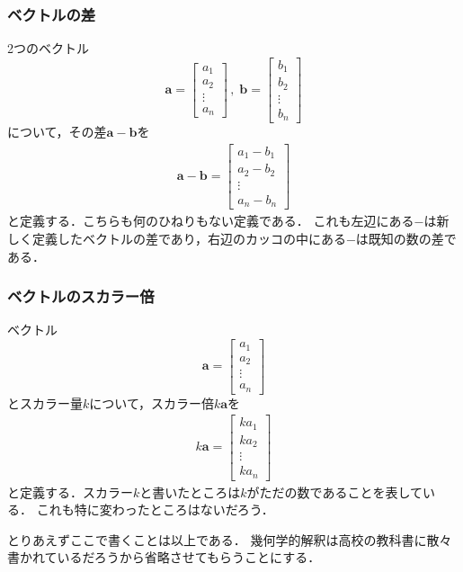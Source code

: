 \subsubsection{ベクトルの差}
2つのベクトル
$$
\bm{a} = \left[
 \begin{array}{c}
   a_1 \\
   a_2 \\
   \vdots \\
   a_n 
 \end{array}
            \right]
\, , \; 
\bm{b} = \left[
 \begin{array}{c}
   b_1 \\
   b_2 \\
   \vdots \\
   b_n 
 \end{array}
            \right]
$$
について，その差$\bm{a}-\bm{b}$を
\begin{align}
\bm{a}-\bm{b} = \left[
 \begin{array}{c}
   a_1-b_1 \\
   a_2-b_2 \\
   \vdots \\
   a_n-b_n 
 \end{array}
\right]
\label{eqn:vecsa}
\end{align}
と定義する．こちらも何のひねりもない定義である．
これも左辺にある$-$は新しく定義したベクトルの差であり，右辺のカッコの中にある$-$は既知の数の差である．
\subsubsection{ベクトルのスカラー倍}
ベクトル
$$
\bm{a} = \left[
 \begin{array}{c}
   a_1 \\
   a_2 \\
   \vdots \\
   a_n 
 \end{array}
\right]
$$
とスカラー量$k$について，スカラー倍$k\bm{a}$を
\begin{align}
k\bm{a} = \left[
 \begin{array}{c}
   ka_1 \\
   ka_2 \\
   \vdots \\
   ka_n 
 \end{array}
\right]
\label{eq:vecsukara}
\end{align}
と定義する．スカラー$k$と書いたところは$k$がただの数であることを表している．
これも特に変わったところはないだろう．

とりあえずここで書くことは以上である．
幾何学的解釈は高校の教科書に散々書かれているだろうから省略させてもらうことにする．
